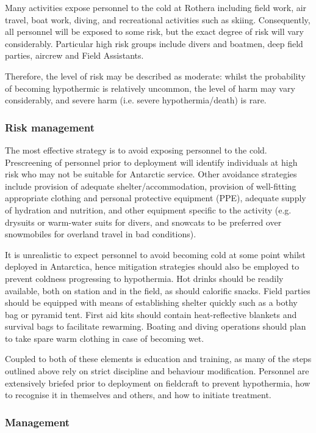 \documentclass[12pt,a4paper]{article}
\begin{document}
Many activities expose personnel to the cold at Rothera including field work, air travel, boat work, diving, and recreational activities such as skiing. Consequently, all personnel will be exposed to some risk, but the exact degree of risk will vary considerably. Particular high risk groups include divers and boatmen, deep field parties, aircrew and Field Assistants.

Therefore, the level of risk may be described as moderate: whilst the probability of becoming hypothermic is relatively uncommon, the level of harm may vary considerably, and severe harm (i.e. severe hypothermia/death) is rare.

\subsubsection{Risk management}

The most effective strategy is to avoid exposing personnel to the cold. Prescreening of personnel prior to deployment will identify individuals at high risk who may not be suitable for Antarctic service. Other avoidance strategies include provision of adequate shelter/accommodation, provision of well-fitting appropriate clothing and personal protective equipment (PPE), adequate supply of hydration and nutrition, and other equipment specific to the activity (e.g. drysuits or warm-water suits for divers, and snowcats to be preferred over snowmobiles for overland travel in bad conditions).

It is unrealistic to expect personnel to avoid becoming cold at some point whilst deployed in Antarctica, hence mitigation strategies should also be employed to prevent coldness progressing to hypothermia. Hot drinks should be readily available, both on station and in the field, as should calorific snacks. Field parties should be equipped with means of establishing shelter quickly such as a bothy bag or pyramid tent. First aid kits should contain heat-reflective blankets and survival bags to facilitate rewarming. Boating and diving operations should plan to take spare warm clothing in case of becoming wet.

Coupled to both of these elements is education and training, as many of the steps outlined above rely on strict discipline and behaviour modification. Personnel are extensively briefed prior to deployment on fieldcraft to prevent hypothermia, how to recognise it in themselves and others, and how to initiate treatment.

\subsubsection{Management}
\end{document}
